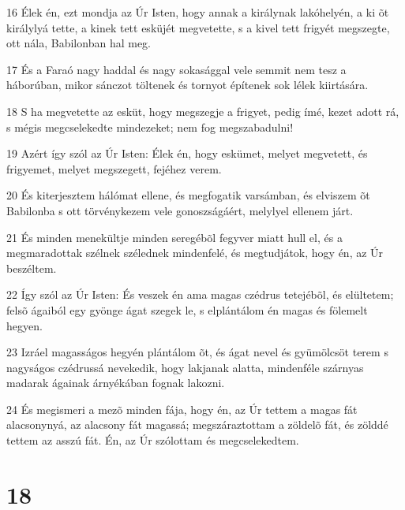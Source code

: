 \par 16 Élek én, ezt mondja az Úr Isten, hogy annak a királynak lakóhelyén, a ki õt királylyá tette,  a kinek tett esküjét megvetette, s a kivel tett frigyét megszegte, ott nála, Babilonban hal meg.
\par 17 És a Faraó nagy haddal és nagy sokasággal vele semmit nem tesz a háborúban, mikor sánczot töltenek és tornyot építenek sok lélek kiirtására.
\par 18 S ha megvetette az esküt, hogy megszegje a frigyet, pedig ímé, kezet adott rá, s mégis megcselekedte mindezeket; nem fog megszabadulni!
\par 19 Azért így szól az Úr Isten: Élek én, hogy eskümet, melyet megvetett, és frigyemet, melyet megszegett, fejéhez verem.
\par 20 És kiterjesztem hálómat ellene, és megfogatik varsámban, és elviszem õt Babilonba s ott törvénykezem vele gonoszságáért, melylyel ellenem járt.
\par 21 És minden menekültje minden seregébõl fegyver miatt hull el, és a megmaradottak szélnek szélednek mindenfelé, és megtudjátok, hogy én, az Úr beszéltem.
\par 22 Így szól az Úr Isten: És veszek én ama magas czédrus tetejébõl, és elültetem; felsõ ágaiból egy gyönge ágat szegek le, s elplántálom én magas és fölemelt hegyen.
\par 23 Izráel magasságos hegyén plántálom õt, és ágat nevel és gyümölcsöt terem s nagyságos czédrussá nevekedik, hogy lakjanak alatta, mindenféle szárnyas madarak ágainak árnyékában fognak lakozni.
\par 24 És megismeri a mezõ minden fája, hogy én, az Úr tettem a magas fát alacsonynyá, az alacsony fát magassá; megszáraztottam a zöldelõ fát, és zölddé tettem az asszú fát. Én, az Úr szólottam és megcselekedtem.

\chapter{18}

